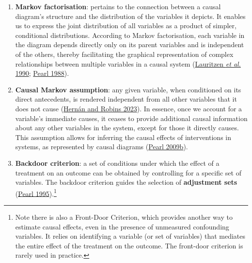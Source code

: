 \documentclass[
  singlecolumn]{article}
\begin{document}
\begin{enumerate}
\def\labelenumi{\arabic{enumi}.}
\setcounter{enumi}{9}
\item
  \textbf{Markov factorisation}: pertains to the connection between a
  causal diagram's structure and the distribution of the variables it
  depicts. It enables us to express the joint distribution of all
  variables as a product of simpler, conditional distributions.
  According to Markov factorisation, each variable in the diagram
  depends directly only on its parent variables and is independent of
  the others, thereby facilitating the graphical representation of
  complex relationships between multiple variables in a causal system
  (\protect\hyperlink{ref-lauritzen1990}{Lauritzen \emph{et al.} 1990};
  \protect\hyperlink{ref-pearl1988}{Pearl 1988}).
\item
  \textbf{Causal Markov assumption}: any given variable, when
  conditioned on its direct antecedents, is rendered independent from
  all other variables that it does not cause
  (\protect\hyperlink{ref-hernuxe1n2023}{Hernán and Robins 2023}). In
  essence, once we account for a variable's immediate causes, it ceases
  to provide additional causal information about any other variables in
  the system, except for those it directly causes. This assumption
  allows for inferring the causal effects of interventions in systems,
  as represented by causal diagrams
  (\protect\hyperlink{ref-pearl2009a}{Pearl 2009b}).
\item
  \textbf{Backdoor criterion}: a set of conditions under which the
  effect of a treatment on an outcome can be obtained by controlling for
  a specific set of variables. The backdoor criterion guides the
  selection of \textbf{adjustment sets}
  (\protect\hyperlink{ref-pearl1995}{Pearl 1995}).\footnote{Note there
    is also a Front-Door Criterion, which provides another way to
    estimate causal effects, even in the presence of unmeasured
    confounding variables. It relies on identifying a variable (or set
    of variables) that mediates the entire effect of the treatment on
    the outcome. The front-door criterion is rarely used in practice.}
\end{enumerate}
\end{document}
